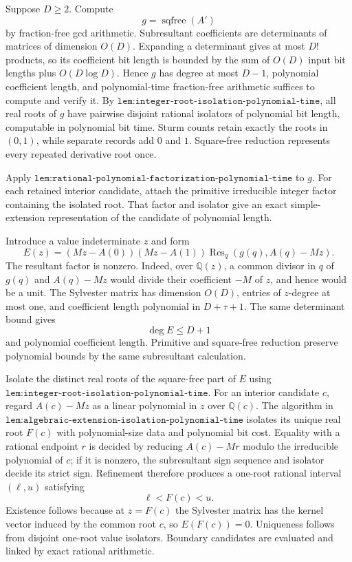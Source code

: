 Suppose \(D\geq2\).  Compute
\[
 g=\operatorname{sqfree}(A')
\]
by fraction-free gcd arithmetic.  Subresultant coefficients are determinants of matrices of dimension \(O(D)\).  Expanding a determinant gives at most \(D!\) products, so its coefficient bit length is bounded by the sum of \(O(D)\) input bit lengths plus \(O(D\log D)\).  Hence \(g\) has degree at most \(D-1\), polynomial coefficient length, and polynomial-time fraction-free arithmetic suffices to compute and verify it.  By \(\texttt{lem:integer-root-isolation-polynomial-time}\), all real roots of \(g\) have pairwise disjoint rational isolators of polynomial bit length, computable in polynomial bit time.  Sturm counts retain exactly the roots in \((0,1)\), while separate records add \(0\) and \(1\).  Square-free reduction represents every repeated derivative root once.

Apply \(\texttt{lem:rational-polynomial-factorization-polynomial-time}\) to \(g\).  For each retained interior candidate, attach the primitive irreducible integer factor containing the isolated root.  That factor and isolator give an exact simple-extension representation of the candidate of polynomial length.

Introduce a value indeterminate \(z\) and form
\[
 E(z)=
 (Mz-A(0))(Mz-A(1))
 \operatorname{Res}_{q}\!\left(g(q),A(q)-Mz\right).
\]
The resultant factor is nonzero.  Indeed, over \(\mathbb Q(z)\), a common divisor in \(q\) of \(g(q)\) and \(A(q)-Mz\) would divide their coefficient \(-M\) of \(z\), and hence would be a unit.  The Sylvester matrix has dimension \(O(D)\), entries of \(z\)-degree at most one, and coefficient length polynomial in \(D+\tau+1\).  The same determinant bound gives
\[
 \deg E\leq D+1
\]
and polynomial coefficient length.  Primitive and square-free reduction preserve polynomial bounds by the same subresultant calculation.

Isolate the distinct real roots of the square-free part of \(E\) using \(\texttt{lem:integer-root-isolation-polynomial-time}\).  For an interior candidate \(c\), regard \(A(c)-Mz\) as a linear polynomial in \(z\) over \(\mathbb Q(c)\).  The algorithm in \(\texttt{lem:algebraic-extension-isolation-polynomial-time}\) isolates its unique real root \(F(c)\) with polynomial-size data and polynomial bit cost.  Equality with a rational endpoint \(r\) is decided by reducing \(A(c)-Mr\) modulo the irreducible polynomial of \(c\); if it is nonzero, the subresultant sign sequence and isolator decide its strict sign.  Refinement therefore produces a one-root rational interval \((\ell,u)\) satisfying
\[
 \ell<F(c)<u.
\]
Existence follows because at \(z=F(c)\) the Sylvester matrix has the kernel vector induced by the common root \(c\), so \(E(F(c))=0\).  Uniqueness follows from disjoint one-root value isolators.  Boundary candidates are evaluated and linked by exact rational arithmetic.

